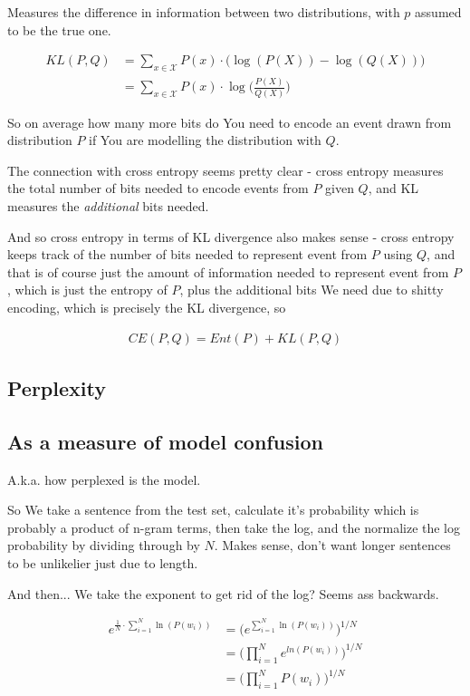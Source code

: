 \documentclass{article}
\begin{document}
		Measures the difference in information between two distributions, with $p$ assumed to be the true one.
		
		\begin{align}
			KL(P, Q) &= \sum_{x\in\mathcal{X}} P(x)\cdot\big(\log(P(X)) - \log(Q(X)) \big)\\
			&= \sum_{x\in\mathcal{X}} P(x)\cdot\log\bigg(\frac{P(X)}{Q(X)}\bigg)
		\end{align}
		
		So on average how many more bits do You need to encode an event drawn from distribution $P$ if You are modelling the distribution with $Q$.
		
		The connection with cross entropy seems pretty clear - cross entropy measures the total number of bits needed to encode events from $P$ given $Q$, and KL measures the \textit{additional} bits needed.
		
		And so cross entropy in terms of KL divergence also makes sense - cross entropy keeps track of the number of bits needed to represent event from $P$ using $Q$, and that is of course just the amount of information needed to represent event from $P$, which is just the entropy of $P$, plus the additional bits We need due to shitty encoding, which is precisely the KL divergence, so
		
		\begin{align}
			CE(P, Q) = Ent(P) + KL(P, Q)
		\end{align}
		
	\subsection{Perplexity}
	
		\subsection{As a measure of model confusion}
		
			A.k.a. how perplexed is the model.
			
			So We take a sentence from the test set, calculate it's probability which is probably a product of n-gram terms, then take the log, and the normalize the log probability by dividing through by $N$. Makes sense, don't want longer sentences to be unlikelier just due to length.
			
			And then... We take the exponent to get rid of the log? Seems ass backwards.
			
			\begin{align}
				e^{\frac{1}{N}\cdot\sum^N_{i=1}\ln(P(w_i))} &= \big(e^{\sum^N_{i=1}\ln(P(w_i))}\big)^{1/N}\\
				&= \bigg(\prod^N_{i=1} e^{ln(P(w_i))}\bigg)^{1/N}\\
				&= \bigg(\prod^N_{i=1} P(w_i)\bigg)^{1/N}
			\end{align}
			
\end{document}
